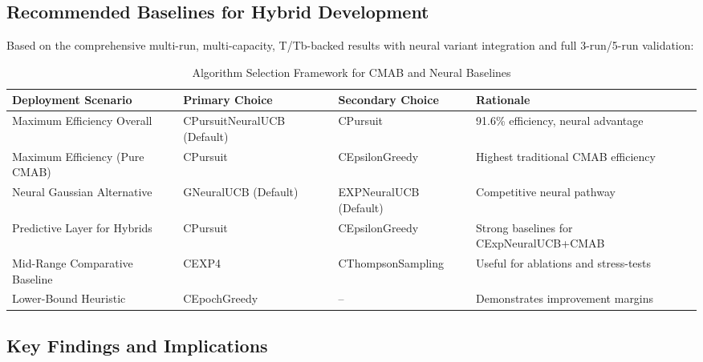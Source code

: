 \documentclass[12pt,a4paper]{article}
\begin{document}
\subsection{Recommended Baselines for Hybrid Development}

Based on the comprehensive multi-run, multi-capacity, T/Tb-backed results with neural variant integration and full 3-run/5-run validation:

\begin{table}[H]
\scriptsize
\centering
\caption{Algorithm Selection Framework for CMAB and Neural Baselines}
\begin{tabular}{|l|l|l|l|}
\hline
\textbf{Deployment Scenario} & \textbf{Primary Choice} & \textbf{Secondary Choice} & \textbf{Rationale} \\
\hline
\hline
Maximum Efficiency Overall & CPursuitNeuralUCB (Default) & CPursuit & 91.6\% efficiency, neural advantage \\
Maximum Efficiency (Pure CMAB) & CPursuit & CEpsilonGreedy & Highest traditional CMAB efficiency \\
Neural Gaussian Alternative & GNeuralUCB (Default) & EXPNeuralUCB (Default) & Competitive neural pathway \\
Predictive Layer for Hybrids & CPursuit & CEpsilonGreedy & Strong baselines for CExpNeuralUCB+CMAB \\
Mid-Range Comparative Baseline & CEXP4 & CThompsonSampling & Useful for ablations and stress-tests \\
Lower-Bound Heuristic & CEpochGreedy & -- & Demonstrates improvement margins \\
\hline
\end{tabular}
\end{table}

\subsection{Key Findings and Implications}
\end{document}
